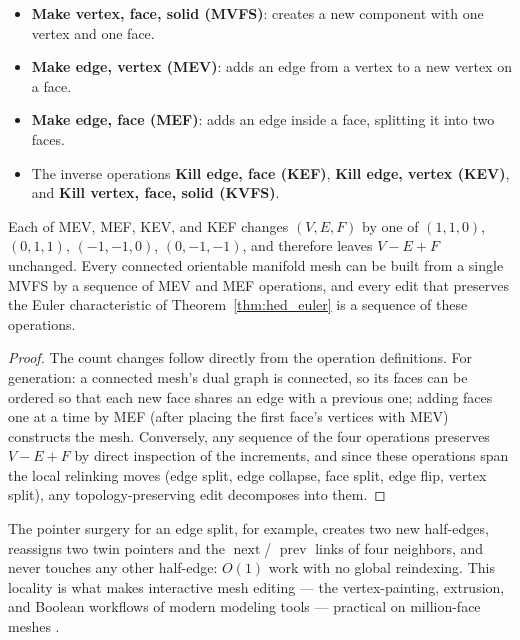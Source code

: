 \begin{itemize}
  \item \textbf{Make vertex, face, solid (MVFS)}: creates a new component
    with one vertex and one face.
  \item \textbf{Make edge, vertex (MEV)}: adds an edge from a vertex to a
    new vertex on a face.
  \item \textbf{Make edge, face (MEF)}: adds an edge inside a face,
    splitting it into two faces.
  \item The inverse operations \textbf{Kill edge, face (KEF)}, \textbf{Kill
    edge, vertex (KEV)}, and \textbf{Kill vertex, face, solid (KVFS)}.
\end{itemize}

\begin{theorem}\label{thm:hed_euler_ops}
Each of MEV, MEF, KEV, and KEF changes $(V, E, F)$ by one of
$(1,1,0)$, $(0,1,1)$, $(-1,-1,0)$, $(0,-1,-1)$, and therefore leaves
$V - E + F$ unchanged. Every connected orientable manifold mesh can be
built from a single MVFS by a sequence of MEV and MEF operations, and
every edit that preserves the Euler characteristic of
Theorem~\ref{thm:hed_euler} is a sequence of these operations.
\end{theorem}

\begin{proof}
The count changes follow directly from the operation definitions. For
generation: a connected mesh's dual graph is connected, so its faces can be
ordered so that each new face shares an edge with a previous one; adding
faces one at a time by MEF (after placing the first face's vertices with
MEV) constructs the mesh. Conversely, any sequence of the four operations
preserves $V - E + F$ by direct inspection of the increments, and since
these operations span the local relinking moves (edge split, edge collapse,
face split, edge flip, vertex split), any topology-preserving edit
decomposes into them.
\end{proof}

The pointer surgery for an edge split, for example, creates two new
half-edges, reassigns two twin pointers and the $\operatorname{next}$/
$\operatorname{prev}$ links of four neighbors, and never touches any other
half-edge: $O(1)$ work with no global reindexing. This locality is what
makes interactive mesh editing --- the vertex-painting,
extrusion, and Boolean workflows of modern modeling tools --- practical on
million-face meshes \cite{botsch2010,ericson2004}.

